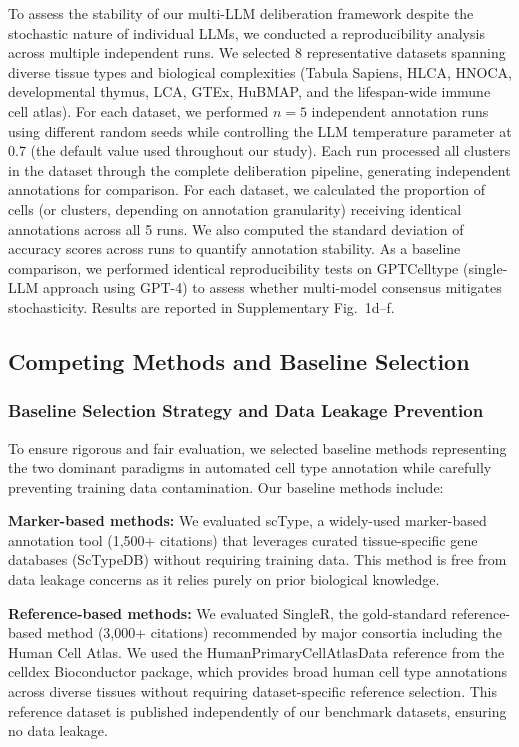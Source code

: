 \documentclass[pdflatex,sn-nature]{sn-jnl}%
\theoremstyle{thmstyleone}%
\theoremstyle{thmstyletwo}%
\theoremstyle{thmstylethree}%
\begin{document}
To assess the stability of our multi-LLM deliberation framework despite the stochastic nature of individual LLMs, we conducted a reproducibility analysis across multiple independent runs. We selected 8 representative datasets spanning diverse tissue types and biological complexities (Tabula Sapiens, HLCA, HNOCA, developmental thymus, LCA, GTEx, HuBMAP, and the lifespan-wide immune cell atlas). For each dataset, we performed $n=5$ independent annotation runs using different random seeds while controlling the LLM temperature parameter at 0.7 (the default value used throughout our study). Each run processed all clusters in the dataset through the complete deliberation pipeline, generating independent annotations for comparison. For each dataset, we calculated the proportion of cells (or clusters, depending on annotation granularity) receiving identical annotations across all 5 runs. We also computed the standard deviation of accuracy scores across runs to quantify annotation stability. As a baseline comparison, we performed identical reproducibility tests on GPTCelltype (single-LLM approach using GPT-4) to assess whether multi-model consensus mitigates stochasticity. Results are reported in Supplementary Fig.~1d--f.

\subsection{Competing Methods and Baseline Selection}

\subsubsection{Baseline Selection Strategy and Data Leakage Prevention}
To ensure rigorous and fair evaluation, we selected baseline methods representing the two dominant paradigms in automated cell type annotation while carefully preventing training data contamination. Our baseline methods include:

\textbf{Marker-based methods:} We evaluated scType\cite{ianevski2022fully}, a widely-used marker-based annotation tool (1,500+ citations) that leverages curated tissue-specific gene databases (ScTypeDB) without requiring training data. This method is free from data leakage concerns as it relies purely on prior biological knowledge.

\textbf{Reference-based methods:} We evaluated SingleR\cite{aran2019reference}, the gold-standard reference-based method (3,000+ citations) recommended by major consortia including the Human Cell Atlas. We used the HumanPrimaryCellAtlasData reference from the celldex Bioconductor package, which provides broad human cell type annotations across diverse tissues without requiring dataset-specific reference selection. This reference dataset is published independently of our benchmark datasets, ensuring no data leakage.
\end{document}
